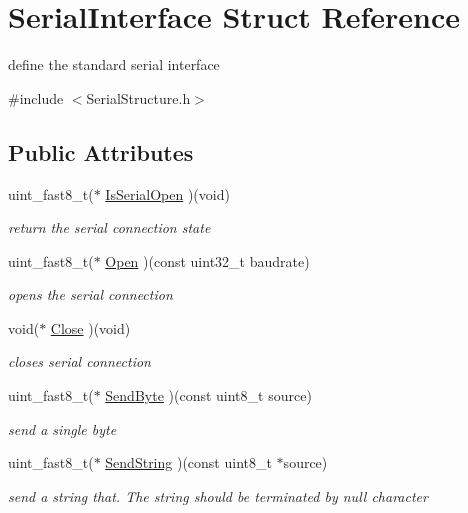 \hypertarget{struct_serial_interface}{\section{Serial\-Interface Struct Reference}
\label{struct_serial_interface}
}


define the standard serial interface  




{\ttfamily \#include $<$Serial\-Structure.\-h$>$}

\subsection*{Public Attributes}
\begin{DoxyCompactItemize}
\item 
uint\-\_\-fast8\-\_\-t($\ast$ \hyperlink{struct_serial_interface_aa12245208003c78ea024ad24f9d84f2a}{Is\-Serial\-Open} )(void)
\begin{DoxyCompactList}\small\item\em return the serial connection state \end{DoxyCompactList}\item 
uint\-\_\-fast8\-\_\-t($\ast$ \hyperlink{struct_serial_interface_ab506189cbcec1de46dfc75142fb82068}{Open} )(const uint32\-\_\-t baudrate)
\begin{DoxyCompactList}\small\item\em opens the serial connection \end{DoxyCompactList}\item 
void($\ast$ \hyperlink{struct_serial_interface_a6a28860e0cb0ab7a3f9c49527e883685}{Close} )(void)
\begin{DoxyCompactList}\small\item\em closes serial connection \end{DoxyCompactList}\item 
uint\-\_\-fast8\-\_\-t($\ast$ \hyperlink{struct_serial_interface_aac8d6d754ee55b326fa8877cf5b51947}{Send\-Byte} )(const uint8\-\_\-t source)
\begin{DoxyCompactList}\small\item\em send a single byte \end{DoxyCompactList}\item 
uint\-\_\-fast8\-\_\-t($\ast$ \hyperlink{struct_serial_interface_a2dc11441227e78ac5a281f88f8fab577}{Send\-String} )(const uint8\-\_\-t $\ast$source)
\begin{DoxyCompactList}\small\item\em send a string that. The string should be terminated by null character \end{DoxyCompactList}\item 

\end{DoxyCompactItemize}
